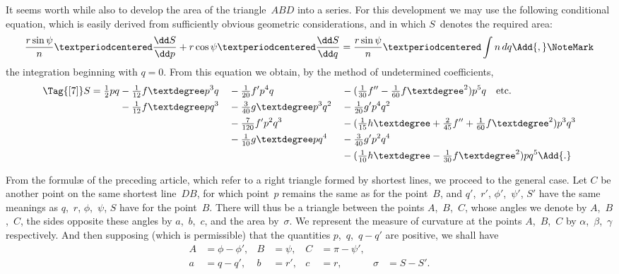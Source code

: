 It seems worth while also to develop the area of the triangle~$ABD$ into a series.
For this development we may use the following conditional equation, which is easily
derived from sufficiently obvious geometric considerations, and in which $S$~denotes the
required area:
\[
\frac{r\sin\psi}{n}·\frac{\dd S}{\dd p}
  + r\cos\psi·\frac{\dd S}{\dd q}
  = \frac{r\sin\psi}{n}·\int n\, dq\Add{,}\NoteMark
\]
the integration beginning with $q = 0$. From this equation we obtain, by the method
of undetermined coefficients,
\begin{alignat*}{3}
\Tag{[7]}
S = \tfrac{1}{2}pq
  &- \tfrac{1}{12}f°p^{3}q
  &&- \tfrac{1}{20}f'p^{4}q
  &&- (\tfrac{1}{30}f'' - \tfrac{1}{60}{f°}^{2})p^{5}q\quad\text{etc.} \\
  &- \tfrac{1}{12}f°pq^{3}
  &&- \tfrac{3}{40}g°p^{3}q^{2}
  &&- \tfrac{1}{20}g'p^{4}q^{2} \\
  &&&- \tfrac{7}{120}f'p^{2}q^{3}
  &&- (\tfrac{1}{15}h° + \tfrac{2}{45}f'' + \tfrac{1}{60}{f°}^{2})p^{3}q^{3} \\
  &&&- \tfrac{1}{10}g°pq^{4}
  &&- \tfrac{3}{40}g'p^{2}q^{4} \\
  &&&&&- (\tfrac{1}{10}h° - \tfrac{1}{30}{f°}^{2})pq^{5}\Add{.}
\end{alignat*}



From the formulæ of the preceding article, which refer to a right triangle formed
by shortest lines, we proceed to the general case. Let $C$ be another point on the
same shortest line~$DB$, for which point~$p$ remains the same as for the point~$B$, and
$q'$,~$r'$, $\phi'$,~$\psi'$, $S'$ have the same meanings as $q$,~$r$, $\phi$,~$\psi$, $S$ have for the point~$B$. There
will thus be a triangle between the points $A$,~$B$,~$C$, whose angles we denote by
$A$,~$B$,~$C$, the sides opposite these angles by $a$,~$b$,~$c$, and the area by~$\sigma$. We represent
the measure of curvature at the points $A$,~$B$,~$C$ by $\alpha$,~$\beta$,~$\gamma$ respectively. And then
supposing (which is permissible) that the quantities $p$,~$q$,~$q - q'$ are positive, we shall
have
\begin{align*}
A &= \phi - \phi', & B &= \psi, & C &= \pi - \psi', && \\
a &= q - q',       & b &= r',   & c &= r,           & \sigma &= S - S'.
\end{align*}

